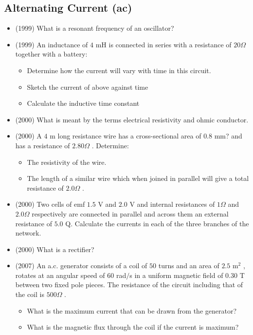 \documentclass{article}
\begin{document}
\subsection{Alternating Current (ac)}
\begin{itemize}
\item (1999)  What is a resonant frequency of an oscillator?
\item (1999)  An inductance of $ 4$ mH is connected in series with a resistance of $ 20\Omega $ together with a battery:\begin{itemize}
\item Determine how the current will vary with time in this circuit.
\item Sketch the current of above against time
\item Calculate the inductive time constant
\end{itemize}
\item (2000)  What is meant by the terms electrical resistivity and ohmic conductor.
\item (2000)  A $ 4$ m long resistance wire has a cross-sectional area of $ 0.8$ mm? and has a resistance of $ 2.80\Omega $ .  Determine:\begin{itemize}
\item The resistivity of the wire.
\item The length of a similar wire which when joined in parallel will give a total resistance of $ 2.0\Omega $ .
\end{itemize}
\item (2000)  Two cells of emf $ 1.5$ V and $ 2.0$ V and internal resistances of $ 1\Omega $ and $ 2.0\Omega $ respectively are connected in parallel and across them an external resistance of $ 5.0$ Q. Calculate the currents in each of the three branches of the network. 
\item (2000)  What is a rectifier?
\item (2007)  An a.c. generator consists of a coil of $ 50$ turns and an area of $ 2.5$ m$ ^{2}$ , rotates at an angular speed of $ 60$ rad$/$s in a uniform magnetic field of $ 0.30$ T between two fixed pole pieces.  The resistance of the circuit including that of the coil is $ 500\Omega $ .  \begin{itemize}
\item  What is the maximum current that can be drawn from the generator?
\item  What is the magnetic flux through the coil if the current is maximum?
\end{itemize}

\end{itemize}
\end{document}
